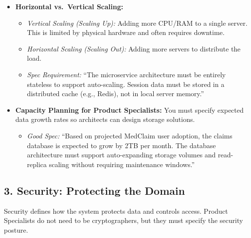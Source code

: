 \documentclass[
  11pt,
  openany,
  oneside]{book}
\providecommand{\tightlist}{%
  \setlength{\itemsep}{0pt}\setlength{\parskip}{0pt}}
\begin{document}
\begin{itemize}
\tightlist
\item
  \textbf{Horizontal vs.~Vertical Scaling:}

  \begin{itemize}
  \tightlist
  \item
    \emph{Vertical Scaling (Scaling Up):} Adding more CPU/RAM to a
    single server. This is limited by physical hardware and often
    requires downtime.
  \item
    \emph{Horizontal Scaling (Scaling Out):} Adding more servers to
    distribute the load.
  \item
    \emph{Spec Requirement:} ``The microservice architecture must be
    entirely stateless to support auto-scaling. Session data must be
    stored in a distributed cache (e.g., Redis), not in local server
    memory.''
  \end{itemize}
\item
  \textbf{Capacity Planning for Product Specialists:} You must specify
  expected data growth rates so architects can design storage solutions.

  \begin{itemize}
  \tightlist
  \item
    \emph{Good Spec:} ``Based on projected MedClaim user adoption, the
    claims database is expected to grow by 2TB per month. The database
    architecture must support auto-expanding storage volumes and
    read-replica scaling without requiring maintenance windows.''
  \end{itemize}
\end{itemize}

\subsection{3. Security: Protecting the
Domain}\label{security-protecting-the-domain}

Security defines how the system protects data and controls access.
Product Specialists do not need to be cryptographers, but they must
specify the security posture.
\end{document}
